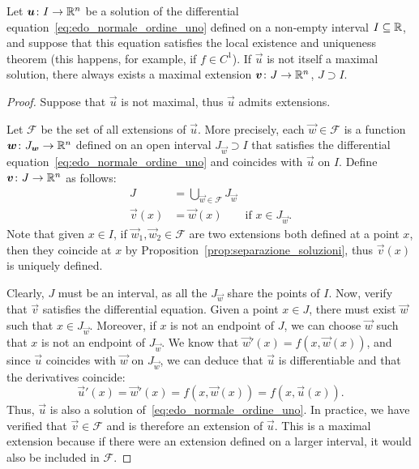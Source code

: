 \begin{theorem}
\label{th:edo_esistenza_massimali}
Let $\boldsymbol u\colon I\to {\mathbb R}^n$ be a solution of the differential
equation~\eqref{eq:edo_normale_ordine_uno} defined on a non-empty interval
$I\subseteq {\mathbb R}$, and suppose that this equation satisfies the local existence and
uniqueness theorem (this happens, for example, if $f\in C^1$). If $\vec u$ is
not itself a maximal solution, there always exists a maximal extension $\boldsymbol v\colon J\to {\mathbb R}^n$, $J\supset I$.
\end{theorem}
%
\begin{proof}
Suppose that $\vec u$ is not maximal, thus $\vec u$ admits extensions. 

Let $\mathcal F$ be the set of all extensions of $\vec u$. More precisely, each
$\vec w\in \mathcal F$ is a function $\boldsymbol w\colon J_{\boldsymbol w}\to {\mathbb R}^n$ defined
on an open interval $J_{\vec w}\supset I$ that satisfies the differential
equation~\eqref{eq:edo_normale_ordine_uno} and coincides with $\vec u$ on $I$.
Define $\boldsymbol v\colon J\to{\mathbb R}^n$ as follows:
\begin{align*}
J &= \bigcup_{\vec w \in \mathcal F} J_{\vec w}\\
\vec v(x) &= \vec w(x) \qquad\text{if $x\in J_{\vec w}$}.
\end{align*}
Note that given $x\in I$, if $\vec w_1, \vec w_2\in\mathcal F$ are two
extensions both defined at a point $x$, then they coincide at $x$ by
Proposition~\ref{prop:separazione_soluzioni}, thus $\vec v(x)$ is uniquely
defined.

Clearly, $J$ must be an interval, as all the $J_{\vec w}$ share the points of
$I$. Now, verify that $\vec v$ satisfies the differential equation. Given a
point $x\in J$, there must exist $\vec w$ such that $x\in J_{\vec w}$. Moreover,
if $x$ is not an endpoint of $J$, we can choose $\vec w$ such that $x$ is not an
endpoint of $J_{\vec w}$. We know that $\vec w'(x) = f(x,\vec w(x))$, and since
$\vec u$ coincides with $\vec w$ on $J_{\vec w}$, we can deduce that $\vec u$ is
differentiable and that the derivatives coincide:
\[
\vec u'(x) = \vec w'(x) = f(x,\vec w(x)) = f(x,\vec u(x)).
\]
Thus, $\vec u$ is also a solution of~\eqref{eq:edo_normale_ordine_uno}. In
practice, we have verified that $\vec v\in \mathcal F$ and is therefore an
extension of $\vec u$. This is a maximal extension because if there were an
extension defined on a larger interval, it would also be included in $\mathcal
F$.
\end{proof}

